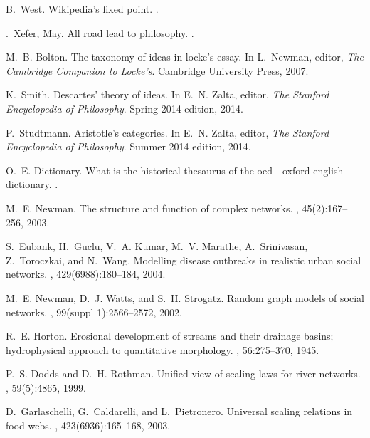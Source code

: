 \documentclass[pre,twocolumn,twoside,superscriptaddress,floatfix]{revtex4-1}
\begin{document}
{\begin{thebibliography}{10}
B.~West.
\newblock Wikipedia's fixed point.
.

.~Xefer, May.
\newblock All road lead to philosophy.
.

M.~B. Bolton.
\newblock The taxonomy of ideas in locke's essay.
\newblock In L.~Newman, editor, {\em The Cambridge Companion to Locke's}.
  Cambridge University Press, 2007.

K.~Smith.
\newblock Descartes' theory of ideas.
\newblock In E.~N. Zalta, editor, {\em The Stanford Encyclopedia of
  Philosophy}. Spring 2014 edition, 2014.

P.~Studtmann.
\newblock Aristotle's categories.
\newblock In E.~N. Zalta, editor, {\em The Stanford Encyclopedia of
  Philosophy}. Summer 2014 edition, 2014.

O.~E. Dictionary.
\newblock What is the historical thesaurus of the oed - oxford english
  dictionary.
.

M.~E. Newman.
\newblock The structure and function of complex networks.
, 45(2):167--256, 2003.

S.~Eubank, H.~Guclu, V.~A. Kumar, M.~V. Marathe, A.~Srinivasan, Z.~Toroczkai,
  and N.~Wang.
\newblock Modelling disease outbreaks in realistic urban social networks.
, 429(6988):180--184, 2004.

M.~E. Newman, D.~J. Watts, and S.~H. Strogatz.
\newblock Random graph models of social networks.
, 99(suppl
  1):2566--2572, 2002.

R.~E. Horton.
\newblock Erosional development of streams and their drainage basins;
  hydrophysical approach to quantitative morphology.
, 56:275--370, 1945.

P.~S. Dodds and D.~H. Rothman.
\newblock Unified view of scaling laws for river networks.
, 59(5):4865, 1999.

D.~Garlaschelli, G.~Caldarelli, and L.~Pietronero.
\newblock Universal scaling relations in food webs.
, 423(6936):165--168, 2003.


\end{thebibliography}}
\end{document}
